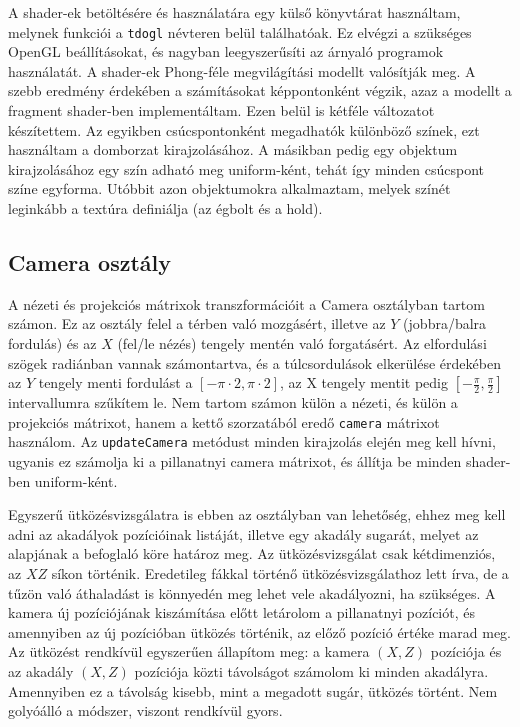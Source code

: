 A shader-ek betöltésére és használatára egy külső könyvtárat használtam, melynek funkciói a \texttt{tdogl} névteren belül találhatóak. Ez elvégzi a szükséges OpenGL beállításokat, és nagyban leegyszerűsíti az árnyaló programok használatát. A shader-ek Phong-féle megvilágítási modellt valósítják meg. A szebb eredmény érdekében a számításokat képpontonként végzik, azaz a modellt a fragment shader-ben implementáltam. Ezen belül is kétféle változatot készítettem. Az egyikben csúcspontonként megadhatók különböző színek, ezt használtam a domborzat kirajzolásához. A másikban pedig egy objektum kirajzolásához egy szín adható meg uniform-ként, tehát így minden csúcspont színe egyforma. Utóbbit azon objektumokra alkalmaztam, melyek színét leginkább a textúra definiálja (az égbolt és a hold).

\subsection{Camera osztály}

A nézeti és projekciós mátrixok transzformációit a Camera osztályban tartom számon. Ez az osztály felel a térben való mozgásért, illetve az $Y$ (jobbra/balra fordulás) és az $X$ (fel/le nézés) tengely mentén való forgatásért. 
Az elfordulási szögek radiánban vannak számontartva, és a túlcsordulások elkerülése érdekében az $Y$ tengely menti fordulást a $[-\pi \cdot 2, \pi \cdot 2]$, az X tengely mentit pedig $\left[-\frac{\pi}{2}, \frac{\pi}{2}\right]$ intervallumra szűkítem le. Nem tartom számon külön a nézeti, és külön a projekciós mátrixot, hanem a kettő szorzatából eredő \texttt{camera} mátrixot használom. Az \texttt{updateCamera} metódust minden kirajzolás elején meg kell hívni, ugyanis ez számolja ki a pillanatnyi camera mátrixot, és állítja be minden shader-ben uniform-ként. 

Egyszerű ütközésvizsgálatra is ebben az osztályban van lehetőség, ehhez meg kell adni az akadályok pozícióinak listáját, illetve egy akadály sugarát, melyet az alapjának a befoglaló köre határoz meg. Az ütközésvizsgálat csak kétdimenziós, az $XZ$ síkon történik. Eredetileg fákkal történő ütközésvizsgálathoz lett írva, de a tűzön való áthaladást is könnyedén meg lehet vele akadályozni, ha szükséges. A kamera új pozíciójának kiszámítása előtt letárolom a pillanatnyi pozíciót, és amennyiben az új pozícióban ütközés történik, az előző pozíció értéke marad meg. Az ütközést rendkívül egyszerűen állapítom meg: a kamera $(X, Z)$ pozíciója és az akadály $(X, Z)$ pozíciója közti távolságot számolom ki minden akadályra. Amennyiben ez a távolság kisebb, mint a megadott sugár, ütközés történt. Nem golyóálló a módszer, viszont rendkívül gyors.

